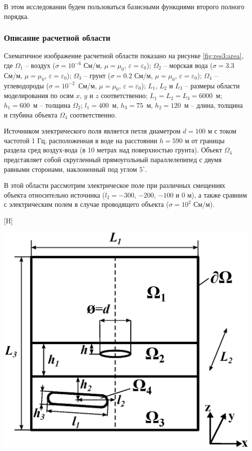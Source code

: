 \documentclass[a4paper,14pt]{article}
\makeatletter
\renewenvironment{figure}[1][\fps@figure]{
  \edef\@tempa{\noexpand\@float{figure}[#1]}
  \@tempa
  \addtocounter{foofigure}{1}
}{
  \end@float
}
\makeatother
\begin{document}
В этом исследовании будем пользоваться базисными функциями второго полного порядка.

\subsubsection{Описание расчетной области}
Схематичное изображение расчетной области показано на рисунке \ref{fig:res3:area}, где $\Omega_1$ -- воздух ($\sigma=10^{-6}$ См/м, $\mu=\mu_0$, $\varepsilon=\varepsilon_0$); $\Omega_2$ -- морская вода ($\sigma=3.3$ См/м, $\mu=\mu_0$, $\varepsilon=\varepsilon_0$); $\Omega_3$ -- грунт ($\sigma=0.2$ См/м, $\mu=\mu_0$, $\varepsilon=\varepsilon_0$); $\Omega_4$ -- углеводороды ($\sigma=10^{-2}$~См/м, $\mu=\mu_0$, $\varepsilon=\varepsilon_0$); $L_1$, $L_2$ и $L_3$ -- размеры области моделирования по осям $x$, $y$ и $z$ соответственно; $L_1 = L_2 = L_3 = 6000$~м; $h_1=600$~м -- толщина $\Omega_2$; $l_1=400$~м, $h_3=75$~м, $h_2=120$~м -- длина, толщина и глубина объекта $\Omega_4$ соответственно.

Источником электрического поля является петля диаметром $d=100$ м с током частотой 1 Гц, расположенная в воде на расстоянии $h=590$ м от границы раздела сред воздух-вода (в 10 метрах над поверхностью грунта). Объект $\Omega_4$
представляет собой скругленный прямоугольный параллелепипед с двумя равными сторонами, наклоненный под углом $5^{\circ}$.

В этой области рассмотрим электрическое поле при различных смещениях объекта относительно источника ($l_2=-300$, $-200$, $-100$ и $0$ м), а также сравним с электрическим полем в случае проводящего объекта ($\sigma=10^2$ См/м).

\begin{figure}[H]
	\centering
	\includegraphics[scale=0.7]{research-3/area/area_3layers_shift_3.eps}
	\caption{схематичное изображение расчетной области}
	\label{fig:res3:area}
\end{figure}
\end{document}
